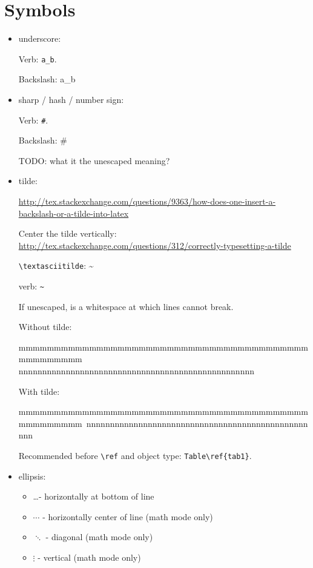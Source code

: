 \documentclass[12pt]{article}
\begin{document}
\section{Symbols}\label{symbols}

  \begin{itemize}

    \item underscore:

      Verb: \verb|a_b|.

      Backslash: a\_b

    \item sharp / hash / number sign:

      Verb: \verb|#|.

      Backslash: \#

      TODO: what it the unescaped meaning?

    \item tilde:

      \url{http://tex.stackexchange.com/questions/9363/how-does-one-insert-a-backslash-or-a-tilde-into-latex}

      Center the tilde vertically: \url{http://tex.stackexchange.com/questions/312/correctly-typesetting-a-tilde}

      \lstinline|\textasciitilde|: \textasciitilde

      verb: \verb|~|

      If unescaped, is a whitespace at which lines cannot break.

      Without tilde:

      mmmmmmmmmmmmmmmmmmmmmmmmmmmmmmmmmmmmmmmmmmmmmmmmmm nnnnnnnnnnnnnnnnnnnnnnnnnnnnnnnnnnnnnnnnnnnnnnnnnn 

      With tilde:

      mmmmmmmmmmmmmmmmmmmmmmmmmmmmmmmmmmmmmmmmmmmmmmmmmm~nnnnnnnnnnnnnnnnnnnnnnnnnnnnnnnnnnnnnnnnnnnnnnnnnn 

      Recommended before \lstinline|\ref| and object type: \lstinline|Table\ref{tab1}|.

    \item ellipsis:

      \begin{itemize}
        \item  \ldots   - horizontally at bottom of line
        \item  $\cdots$ - horizontally center of line (math mode only)
        \item  $\ddots$ - diagonal (math mode only)
        \item  $\vdots$ - vertical (math mode only)
      \end{itemize}


\end{itemize}
\end{document}
